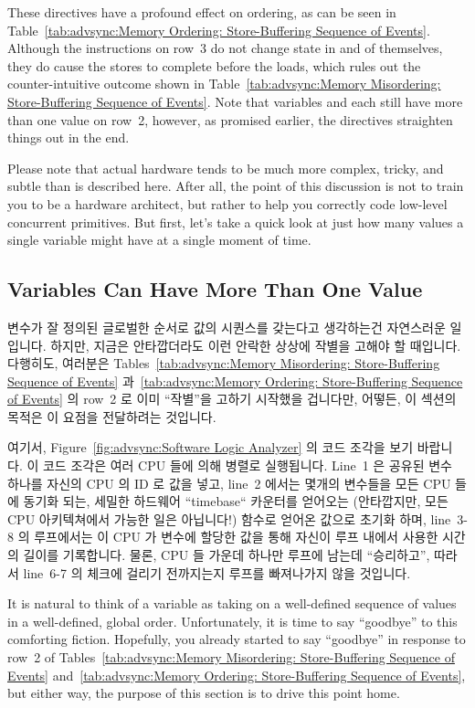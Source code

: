 These directives have a profound effect on ordering, as can be seen in
Table~\ref{tab:advsync:Memory Ordering: Store-Buffering Sequence of Events}.
Although the  instructions on row~3
do not change state
in and of themselves, they do cause the stores to complete before the
loads, which rules out the counter-intuitive outcome shown in
Table~\ref{tab:advsync:Memory Misordering: Store-Buffering Sequence of Events}.
Note that variables  and  each still have more than one
value on row~2, however, as promised earlier, the directives straighten
things out in the end.

Please note that actual hardware tends to be much more complex, tricky,
and subtle than is described here.
After all, the point of this discussion is not to train you to be
a hardware architect, but rather to help you correctly code
low-level concurrent primitives.
But first, let's take a quick look at just how many values a single
variable might have at a single moment of time.
\fi


\subsection{Variables Can Have More Than One Value}
\label{sec:advsync:Variables Can Have More Than One Value}

변수가 잘 정의된 글로벌한 순서로 값의 시퀀스를 갖는다고 생각하는건 자연스러운
일입니다.
하지만, 지금은 안타깝더라도 이런 안락한 상상에 작별을 고해야 할 때입니다.
다행히도, 여러분은
Tables~\ref{tab:advsync:Memory Misordering: Store-Buffering Sequence of Events}
과~\ref{tab:advsync:Memory Ordering: Store-Buffering Sequence of Events} 의
row~2 로 이미 ``작별''을 고하기 시작했을 겁니다만, 어떻든, 이 섹션의 목적은 이
요점을 전달하려는 것입니다.

여기서, Figure~\ref{fig:advsync:Software Logic Analyzer} 의 코드 조각을
보기 바랍니다.
이 코드 조각은 여러 CPU 들에 의해 병렬로 실행됩니다.
Line~1 은 공유된 변수 하나를 자신의 CPU 의 ID 로 값을 넣고, line~2 에서는
몇개의 변수들을 모든 CPU 들에 동기화 되는, 세밀한 하드웨어 ``timebase``
카운터를 얻어오는 (안타깝지만, 모든 CPU 아키텍쳐에서 가능한 일은 아닙니다!)
 함수로 얻어온 값으로 초기화 하며, line~3-8 의 루프에서는 이 CPU 가
변수에 할당한 값을 통해 자신이 루프 내에서 사용한 시간의 길이를 기록합니다.
물론, CPU 들 가운데 하나만 루프에 남는데 ``승리하고'', 따라서 line~6-7 의
체크에 걸리기 전까지는지 루프를 빠져나가지 않을 것입니다.
\iffalse

It is natural to think of a variable as taking on a well-defined
sequence of values in a well-defined, global order.
Unfortunately, it is time to say ``goodbye'' to this comforting fiction.
Hopefully, you already started to say ``goodbye'' in response to row~2 of
Tables~\ref{tab:advsync:Memory Misordering: Store-Buffering Sequence of Events}
and~\ref{tab:advsync:Memory Ordering: Store-Buffering Sequence of Events},
but either way, the purpose of this section is to drive this point home.

